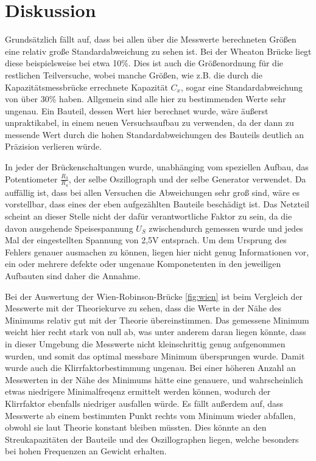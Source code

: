 \section{Diskussion}
\label{sec:Diskussion}

Grundsätzlich fällt auf, dass bei allen über die Messwerte berechneten Größen
eine relativ große Standardabweichung zu sehen ist. Bei der Wheaton Brücke liegt diese
beispielsweise bei etwa 10\%. Dies ist auch die Größenordnung für die restlichen Teilversuche,
wobei manche Größen, wie z.B. die durch die Kapazitätsmessbrücke errechnete Kapazität $C_x$,
sogar eine Standardabweichung von über 30\% haben. Allgemein sind alle hier zu bestimmenden
Werte sehr ungenau. Ein Bauteil, dessen Wert hier berechnet wurde, wäre äußerst unpraktikabel,
in einem neuen Versuchsaufbau zu verwenden, da der dann zu messende Wert durch die hohen Standardabweichungen
des Bauteils deutlich an Präzision verlieren würde. 

In jeder der Brückenschaltungen wurde, unabhänging vom speziellen Aufbau, das Potentiometer $\frac{R_3}{R_4}$,
der selbe Oszillograph und der selbe Generator verwendet. Da auffällig ist, dass bei allen Versuchen die Abweichungen
sehr groß sind, wäre es vorstellbar, dass eines der eben aufgezählten Bauteile beschädigt ist. Das Netzteil scheint an 
dieser Stelle nicht der dafür verantwortliche Faktor zu sein, da die davon ausgehende Speisespannung $U_S$ zwischendurch 
gemessen wurde und jedes Mal der eingestellten Spannung von 2,5\si{\volt} entsprach. Um dem Ursprung des Fehlers genauer 
ausmachen zu können, liegen hier nicht genug Informationen vor, ein oder mehrere defekte oder ungenaue Komponetenten in 
den jeweiligen Aufbauten sind daher die Annahme.

Bei der Auswertung der Wien-Robinson-Brücke \ref{fig:wien} ist beim Vergleich der Messwerte mit der Theoriekurve zu sehen,
dass die Werte in der Nähe des Minimums relativ gut mit der Theorie übereinstimmen. Das gemessene Minimum weicht hier recht stark
von null ab, was unter anderem daran liegen könnte, dass in dieser Umgebung die Messwerte nicht kleinschrittig genug aufgenommen 
wurden, und somit das optimal messbare Minimum übersprungen wurde. Damit wurde auch die Klirrfaktorbestimmung ungenau.
Bei einer höheren Anzahl an Messwerten in der Nähe des Minimums hätte eine genauere, und wahrscheinlich etwas niedrigere Minimalfreqenz
ermittelt werden können, wodurch der Klirrfaktor ebenfalls niedriger ausfallen würde.  Es fällt außerdem auf, dass Messwerte ab einem bestimmten 
Punkt rechts vom Minimum wieder abfallen, obwohl sie laut Theorie konstant bleiben müssten. Dies könnte an den Streukapazitäten der Bauteile und des Oszillographen liegen, 
welche besonders bei hohen Frequenzen an Gewicht erhalten.

